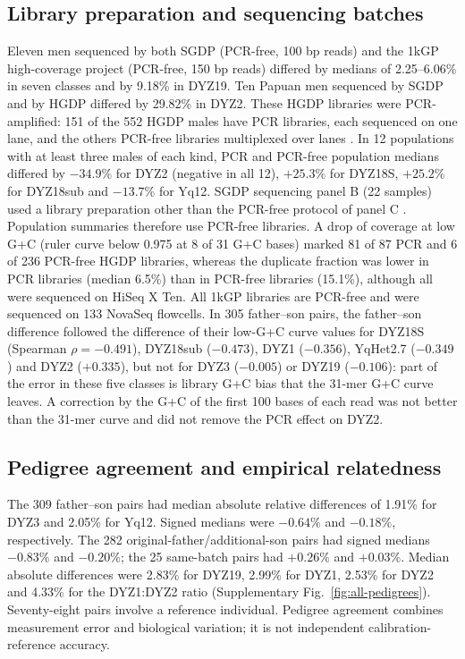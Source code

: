 \documentclass[pdflatex,sn-nature]{sn-jnl}
\begin{document}
\subsection{Library preparation and sequencing batches}\label{sec:res-libraries}
Eleven men sequenced by both SGDP (PCR-free, 100 bp reads) and the 1kGP high-coverage project (PCR-free, 150 bp reads) differed by medians of 2.25--6.06\% in seven classes and by 9.18\% in DYZ19. Ten Papuan men sequenced by SGDP and by HGDP differed by 29.82\% in DYZ2. These HGDP libraries were PCR-amplified: 151 of the 552 HGDP males have PCR libraries, each sequenced on one lane, and the others PCR-free libraries multiplexed over lanes \cite{Bergstrom2020}. In 12 populations with at least three males of each kind, PCR and PCR-free population medians differed by $-34.9\%$ for DYZ2 (negative in all 12), $+25.3\%$ for DYZ18S, $+25.2\%$ for DYZ18sub and $-13.7\%$ for Yq12. SGDP sequencing panel B (22 samples) used a library preparation other than the PCR-free protocol of panel C \cite{Mallick2016}. Population summaries therefore use PCR-free libraries. A drop of coverage at low G+C (ruler curve below 0.975 at 8 of 31 G+C bases) marked 81 of 87 PCR and 6 of 236 PCR-free HGDP libraries, whereas the duplicate fraction was lower in PCR libraries (median 6.5\%) than in PCR-free libraries (15.1\%), although all were sequenced on HiSeq X Ten. All 1kGP libraries are PCR-free and were sequenced on 133 NovaSeq flowcells. In 305 father--son pairs, the father--son difference followed the difference of their low-G+C curve values for DYZ18S (Spearman $\rho=-0.491$), DYZ18sub ($-0.473$), DYZ1 ($-0.356$), YqHet2.7 ($-0.349$) and DYZ2 ($+0.335$), but not for DYZ3 ($-0.005$) or DYZ19 ($-0.106$): part of the error in these five classes is library G+C bias that the 31-mer G+C curve leaves. A correction by the G+C of the first 100 bases of each read was not better than the 31-mer curve and did not remove the PCR effect on DYZ2.

\subsection{Pedigree agreement and empirical relatedness}\label{sec:res-pedigree}
The 309 father--son pairs had median absolute relative differences of 1.91\% for DYZ3 and 2.05\% for Yq12. Signed medians were $-0.64\%$ and $-0.18\%$, respectively. The 282 original-father/additional-son pairs had signed medians $-0.83\%$ and $-0.20\%$; the 25 same-batch pairs had $+0.26\%$ and $+0.03\%$. Median absolute differences were 2.83\% for DYZ19, 2.99\% for DYZ1, 2.53\% for DYZ2 and 4.33\% for the DYZ1:DYZ2 ratio (Supplementary Fig.~\ref{fig:all-pedigrees}). Seventy-eight pairs involve a reference individual. Pedigree agreement combines measurement error and biological variation; it is not independent calibration-reference accuracy.
\end{document}
